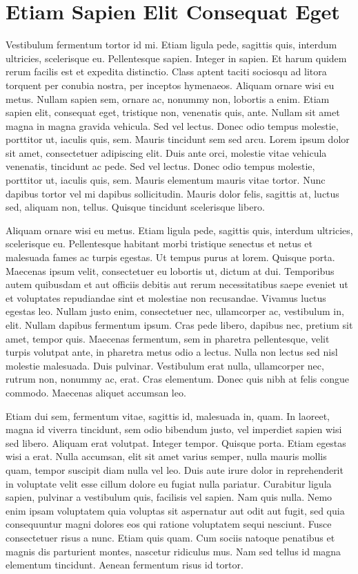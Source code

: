 \chapter{Etiam Sapien Elit Consequat Eget}
Vestibulum fermentum tortor id mi. Etiam ligula pede, sagittis quis, interdum ultricies, scelerisque eu. Pellentesque sapien. Integer in sapien. Et harum quidem rerum facilis est et expedita distinctio. Class aptent taciti sociosqu ad litora torquent per conubia nostra, per inceptos hymenaeos. Aliquam ornare wisi eu metus. Nullam sapien sem, ornare ac, nonummy non, lobortis a enim. Etiam sapien elit, consequat eget, tristique non, venenatis quis, ante. Nullam sit amet magna in magna gravida vehicula. Sed vel lectus. Donec odio tempus molestie, porttitor ut, iaculis quis, sem. Mauris tincidunt sem sed arcu. Lorem ipsum dolor sit amet, consectetuer adipiscing elit. Duis ante orci, molestie vitae vehicula venenatis, tincidunt ac pede. Sed vel lectus. Donec odio tempus molestie, porttitor ut, iaculis quis, sem. Mauris elementum mauris vitae tortor. Nunc dapibus tortor vel mi dapibus sollicitudin. Mauris dolor felis, sagittis at, luctus sed, aliquam non, tellus. Quisque tincidunt scelerisque libero.

Aliquam ornare wisi eu metus. Etiam ligula pede, sagittis quis, interdum ultricies, scelerisque eu. Pellentesque habitant morbi tristique senectus et netus et malesuada fames ac turpis egestas. Ut tempus purus at lorem. Quisque porta. Maecenas ipsum velit, consectetuer eu lobortis ut, dictum at dui. Temporibus autem quibusdam et aut officiis debitis aut rerum necessitatibus saepe eveniet ut et voluptates repudiandae sint et molestiae non recusandae. Vivamus luctus egestas leo. Nullam justo enim, consectetuer nec, ullamcorper ac, vestibulum in, elit. Nullam dapibus fermentum ipsum. Cras pede libero, dapibus nec, pretium sit amet, tempor quis. Maecenas fermentum, sem in pharetra pellentesque, velit turpis volutpat ante, in pharetra metus odio a lectus. Nulla non lectus sed nisl molestie malesuada. Duis pulvinar. Vestibulum erat nulla, ullamcorper nec, rutrum non, nonummy ac, erat. Cras elementum. Donec quis nibh at felis congue commodo. Maecenas aliquet accumsan leo.

Etiam dui sem, fermentum vitae, sagittis id, malesuada in, quam. In laoreet, magna id viverra tincidunt, sem odio bibendum justo, vel imperdiet sapien wisi sed libero. Aliquam erat volutpat. Integer tempor. Quisque porta. Etiam egestas wisi a erat. Nulla accumsan, elit sit amet varius semper, nulla mauris mollis quam, tempor suscipit diam nulla vel leo. Duis aute irure dolor in reprehenderit in voluptate velit esse cillum dolore eu fugiat nulla pariatur. Curabitur ligula sapien, pulvinar a vestibulum quis, facilisis vel sapien. Nam quis nulla. Nemo enim ipsam voluptatem quia voluptas sit aspernatur aut odit aut fugit, sed quia consequuntur magni dolores eos qui ratione voluptatem sequi nesciunt. Fusce consectetuer risus a nunc. Etiam quis quam. Cum sociis natoque penatibus et magnis dis parturient montes, nascetur ridiculus mus. Nam sed tellus id magna elementum tincidunt. Aenean fermentum risus id tortor.

